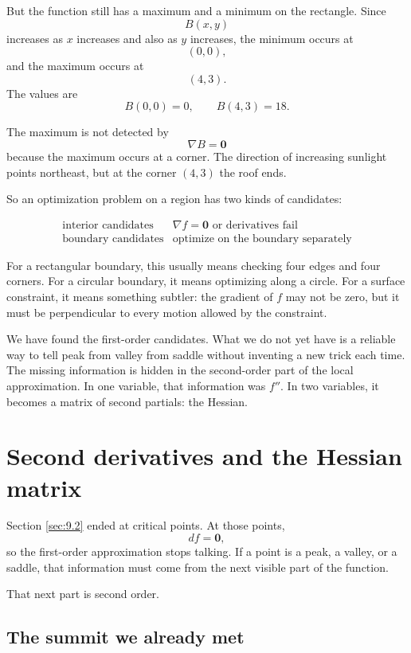 But the function still has a maximum and a minimum on the rectangle.  Since
\[
    B(x,y)
\]
increases as \(x\) increases and also as \(y\) increases, the minimum occurs at
\[
    (0,0),
\]
and the maximum occurs at
\[
    (4,3).
\]
The values are
\[
    B(0,0)=0,
    \qquad
    B(4,3)=18.
\]

The maximum is not detected by
\[
    \nabla B=\mathbf 0
\]
because the maximum occurs at a corner.  The direction of increasing sunlight points
northeast, but at the corner \((4,3)\) the roof ends.

So an optimization problem on a region has two kinds of candidates:

\[
\begin{array}{c|c}
\text{interior candidates} & \nabla f=\mathbf 0 \text{ or derivatives fail}\\[1mm]
\text{boundary candidates} & \text{optimize on the boundary separately}
\end{array}
\]

For a rectangular boundary, this usually means checking four edges and four corners.
For a circular boundary, it means optimizing along a circle.  For a surface constraint,
it means something subtler: the gradient of \(f\) may not be zero, but it must be
perpendicular to every motion allowed by the constraint.

We have found the first-order candidates.  What we do not yet have is a reliable way to
tell peak from valley from saddle without inventing a new trick each time.  The missing
information is hidden in the second-order part of the local approximation.  In one
variable, that information was \(f''\).  In two variables, it becomes a matrix of second
partials: the Hessian.
\section{Second derivatives and the Hessian matrix}
\label{sec:9.3}

Section \ref{sec:9.2} ended at critical points.  At those points,
\[
    df=\mathbf 0,
\]
so the first-order approximation stops talking.  If a point is a peak, a valley, or a
saddle, that information must come from the next visible part of the function.

That next part is second order.

\subsection{The summit we already met}

